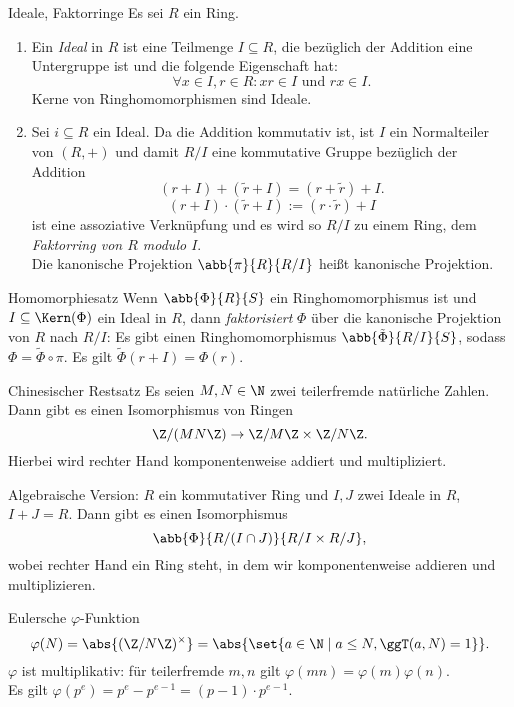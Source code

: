 \begin{karte}{Ideale, Faktorringe}
    Es sei \(R\) ein Ring. 
    \begin{enumerate}
        \item Ein \textit{Ideal} in \(R\) ist eine Teilmenge 
        \(I\subseteq R\), die bezüglich der Addition eine 
        Untergruppe ist und die folgende Eigenschaft hat:
        \[ \forall x \in I, r\in R: xr \in I \text{ und } rx \in I. \]
        Kerne von Ringhomomorphismen sind Ideale.
        \item Sei \(i \subseteq R\) ein Ideal. Da die Addition 
        kommutativ ist, ist \(I\) ein Normalteiler von \((R,+)\) 
        und damit \(R/I\) eine kommutative Gruppe bezüglich der Addition 
        \[ (r+I) + (\tilde{r} + I) = (r + \tilde{r}) + I. \]
        \[ (r + I) \cdot (\tilde{r} + I) := (r \cdot \tilde{r}) + I \]
        ist eine assoziative Verknüpfung und es wird so 
        \(R/I\) zu einem Ring, dem \textit{Faktorring von \(R\) modulo \(I\)}.\\
        Die kanonische Projektion \(\abb{\pi}{R}{R/I}\) heißt kanonische Projektion.
    \end{enumerate}
\end{karte}

\begin{karte}{Homomorphiesatz}
    Wenn \(\abb{\Phi}{R}{S}\) ein Ringhomomorphismus ist und 
    \(I \subseteq \Kern(\Phi)\) ein Ideal in \(R\), dann 
    \textit{faktorisiert} \(\Phi\) über die kanonische Projektion 
    von \(R\) nach \(R/I\): Es gibt einen Ringhomomorphismus 
    \( \abb{\tilde{\Phi}}{R/I}{S} \), sodass \( \Phi = \tilde{\Phi} \circ \pi \).
    Es gilt \(\tilde{\Phi}(r+I) = \Phi(r)\).
\end{karte}

\begin{karte}{Chinesischer Restsatz}
    Es seien \(M,N\in \N\) zwei teilerfremde natürliche Zahlen. 
    Dann gibt es einen Isomorphismus von Ringen 
    \[ \Z/(MN \Z) \rightarrow \Z / M\Z \times \Z/N\Z. \]
    Hierbei wird rechter Hand komponentenweise addiert und multipliziert.

    Algebraische Version: \(R\) ein kommutativer Ring und \(I,J\) 
    zwei Ideale in \(R\), \(I + J = R\). Dann gibt es einen 
    Isomorphismus 
    \[ \abb{\Phi}{R/(I\cap J)}{R/I \times R/J}, \]
    wobei rechter Hand ein Ring steht, in dem wir komponentenweise addieren 
    und multiplizieren.
\end{karte}

\begin{karte}{Eulersche \(\varphi\)-Funktion}
    \[ \varphi(N) = \abs{(\Z/N\Z)^\times} = \abs{\set{a\in \N \;|\; a\leq N, \ggT(a,N) = 1}}. \]
    \(\varphi\) ist multiplikativ: für teilerfremde \(m,n\) gilt \(\varphi(mn) = \varphi(m)\varphi(n)\). \\
    Es gilt \(\varphi(p^e) = p^e - p^{e-1} = (p-1)\cdot p^{e-1}\).
\end{karte}

